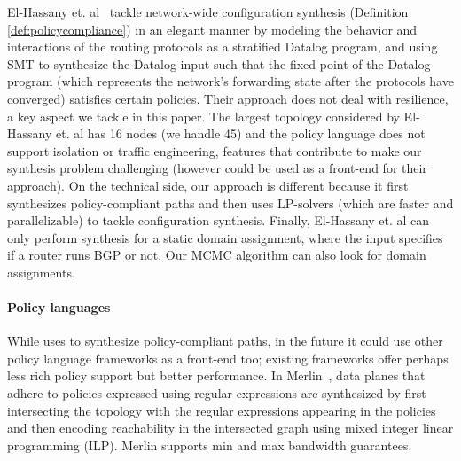 El-Hassany et. al~\cite{synet} tackle network-wide configuration
synthesis (Definition \ref{def:policycompliance}) in an elegant manner by
modeling the behavior and interactions of the routing protocols as a
stratified Datalog program, and using SMT to synthesize the Datalog
input such that the fixed point of the Datalog program (which
represents the network's forwarding state after the protocols have
converged) satisfies certain policies.  
Their approach does not deal with resilience, a key aspect we tackle 
in this paper.
The
largest topology considered by El-Hassany et. al has 16 nodes (we handle 45)
and the policy language does not support isolation or
traffic engineering, 
features that contribute to make our synthesis 
problem challenging (however \genesis could be used 
as a front-end for their approach).  
On the technical side, our approach is different because
it first synthesizes policy-compliant paths and then uses
LP-solvers (which are faster and parallelizable) 
to tackle configuration
synthesis.  
Finally, El-Hassany et. al can only perform synthesis for a
static domain assignment, where the input specifies if a router runs
BGP or not. Our MCMC algorithm can also look for domain assignments.

%

\paragraph{Policy languages} While \name uses \genesis 
to synthesize policy-compliant paths, in the future it could use
other policy language frameworks as a front-end
too; existing frameworks offer perhaps less rich policy support but better
performance. %
In Merlin~\cite{merlin}, data planes that adhere to policies expressed
using regular expressions are synthesized by first intersecting the
topology with the regular expressions appearing in the policies and
then encoding reachability in the intersected graph using mixed
integer linear programming (ILP).  Merlin supports min and max
bandwidth guarantees.

